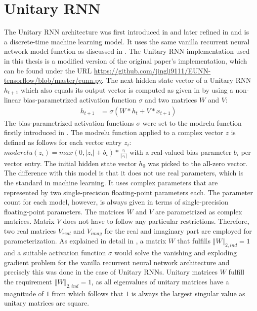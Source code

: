 \documentclass[draft,final]{vutinfth} %
\begin{document}
    \section{Unitary RNN} \label{urnn}
    The Unitary RNN architecture was first introduced in \cite{UnitaryRNNs} and later refined in \cite{EfficientUnitaryRNNs} and is a discrete-time machine learning model.
    It uses the same vanilla recurrent neural network model function as discussed in .
    The Unitary RNN implementation used in this thesis is a modified version of the original paper's implementation, which can be found under the URL \url{https://github.com/jingli9111/EUNN-tensorflow/blob/master/eunn.py}.
    The next hidden state vector of a Unitary RNN $h_{t+1}$ which also equals its output vector is computed as given in \cite[p. 2]{EfficientUnitaryRNNs} by using a non-linear bias-parametrized activation function $\sigma$ and two matrices $W$ and $V$:
    \begin{align}
        \label{urnn_state}
        h_{t+1} &= \sigma(W*h_t + V*x_{t+1})
    \end{align}
    The bias-parametrized activation functions $\sigma$ were set to the modrelu function firstly introduced in \cite[p. 4]{UnitaryRNNs}.
    The modrelu function applied to a complex vector $z$ is defined as follows for each vector entry $z_i$: $moderelu(z_i) = max(0, |z_i|+b_i) * \frac{z_i}{|z_i|}$ with a real-valued bias parameter $b_i$ per vector entry.
    The initial hidden state vector $h_0$ was picked to the all-zero vector.
    The difference with this model is that it does not use real parameters, which is the standard in machine learning.
    It uses complex parameters that are represented by two single-precision floating-point parameters each.
    The parameter count for each model, however, is always given in terms of single-precision floating-point parameters.
    The matrices $W$ and $V$ are parametrized as complex matrices.
    Matrix $V$ does not have to follow any particular restrictions. Therefore, two real matrices $V_{real}$ and $V_{imag}$ for the real and imaginary part are employed for parameterization.
    As explained in detail in , a matrix $W$ that fulfills $\left\Vert W \right\Vert_{2,ind} = 1$ and a suitable activation function $\sigma$ would solve the vanishing and exploding gradient problem for the vanilla recurrent neural network architecture and precisely this was done in the case of Unitary RNNs.
    Unitary matrices $W$ fulfill the requirement $\left\Vert W \right\Vert_{2,ind} = 1$, as all eigenvalues of unitary matrices have a magnitude of $1$ from which follows that $1$ is always the largest singular value as unitary matrices are square.
\end{document}
